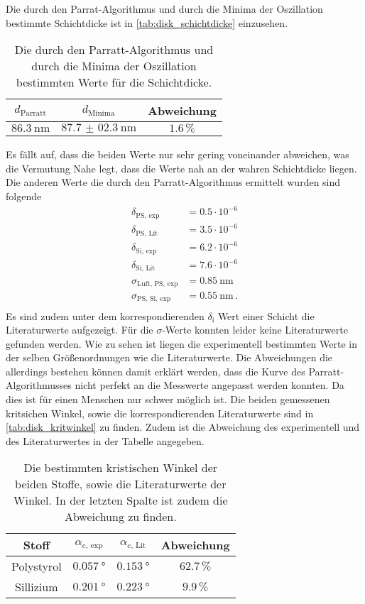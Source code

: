 Die durch den Parrat-Algorithmus und durch die Minima der Oszillation bestimmte Schichtdicke ist in \autoref{tab:disk_schichtdicke} einzusehen.
\begin{table}
    \centering
    \caption{Die durch den Parratt-Algorithmus und durch die Minima der Oszillation bestimmten Werte für die Schichtdicke.}
    \begin{tabular}{ccc}
        \toprule
        $d_\text{Parratt}$ & $d_\text{Minima} $ & Abweichung \\
        \midrule
        $\SI{86.3}{\nano\meter}$ &$\SI{87.7(023)}{\nano\meter}$& $1.6 \, \%$ \\
        \bottomrule
    \end{tabular}
    \label{tab:disk_schichtdicke}
\end{table}
Es fällt auf, dass die beiden Werte nur sehr gering voneinander abweichen, was die Vermutung Nahe legt, dass die Werte nah an der wahren Schichtdicke liegen.
Die anderen Werte die durch den Parratt-Algorithmus ermittelt wurden sind folgende
\begin{align*}
    \delta_\text{PS, exp} &= 0.5 \cdot 10^{-6}      \\
    \delta_\text{PS, Lit} &= 3.5 \cdot 10^{-6}      \\ 
    \delta_\text{Si, exp} &= 6.2 \cdot 10^{-6}      \\
    \delta_\text{Si, Lit} &= 7.6 \cdot 10^{-6}      \\
    \sigma_\text{Luft, PS, exp} &= \SI{0.85}{\nano\meter} \\ 
    \sigma_\text{PS, Si, exp} &= \SI{0.55}{\nano\meter}\, . \\ 
\end{align*}
Es sind zudem unter dem korrespondierenden $\delta_\text{i}$ Wert einer Schicht die Literaturwerte aufgezeigt.
Für die $\sigma$-Werte konnten leider keine Literaturwerte gefunden werden.
Wie zu sehen ist liegen die experimentell bestimmten Werte in der selben Größenordnungen wie die Literaturwerte.
Die Abweichungen die allerdings bestehen können damit erklärt werden, dass die Kurve des Parratt-Algorithmusses nicht perfekt an die Messwerte angepasst werden konnten.
Da dies ist für einen Menschen nur schwer möglich ist.
Die beiden gemessenen kritsichen Winkel, sowie die korrespondierenden Literaturwerte sind in \autoref{tab:disk_kritwinkel} zu finden.
Zudem ist die Abweichung des experimentell und des Literaturwertes in der Tabelle angegeben.
\begin{table}
    \centering
    \caption{Die bestimmten kristischen Winkel der beiden Stoffe, sowie die Literaturwerte der Winkel. In der letzten Spalte ist zudem die Abweichung zu finden.}
    \begin{tabular}{cccc}
        \toprule
        Stoff & $\alpha_\text{c, exp}$ & $\alpha_\text{c, Lit}$ & Abweichung \\
        \midrule
        Polystyrol  &$\SI{0.057}{\degree}$ &$\SI{0.153}{\degree}$ & $62.7\,\%$ \\
        Sillizium &$\SI{0.201}{\degree}$ & $\SI{0.223}{\degree}$ & $9.9 \, \% $ \\
        \bottomrule
    \end{tabular}
    \label{tab:disk_kritwinkel}
\end{table}
